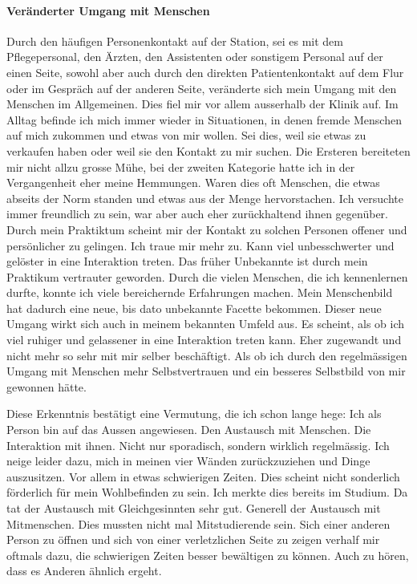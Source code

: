 \paragraph{Veränderter Umgang mit Menschen}
Durch den häufigen Personenkontakt auf der Station, sei es mit dem Pflegepersonal, den Ärzten, den Assistenten oder sonstigem Personal auf der einen Seite, sowohl aber auch durch den direkten Patientenkontakt auf dem Flur oder im Gespräch auf der anderen Seite, veränderte sich mein Umgang mit den Menschen im Allgemeinen. Dies fiel mir vor allem ausserhalb der Klinik auf. Im Alltag befinde ich mich immer wieder in Situationen, in denen fremde Menschen auf mich zukommen und etwas von mir wollen. Sei dies, weil sie etwas zu verkaufen haben oder weil sie den Kontakt zu mir suchen. Die Ersteren bereiteten mir nicht allzu grosse Mühe, bei der zweiten Kategorie hatte ich in der Vergangenheit eher meine Hemmungen. Waren dies oft Menschen, die etwas abseits der Norm standen und etwas aus der Menge hervorstachen. Ich versuchte immer freundlich zu sein, war aber auch eher zurückhaltend ihnen gegenüber. Durch mein Praktiktum scheint mir der Kontakt zu solchen Personen offener und persönlicher zu gelingen. Ich traue mir mehr zu. Kann viel unbesschwerter und gelöster in eine Interaktion treten. Das früher Unbekannte ist durch mein Praktikum vertrauter geworden. Durch die vielen Menschen, die ich kennenlernen durfte, konnte ich viele bereichernde Erfahrungen machen. Mein Menschenbild hat dadurch eine neue, bis dato unbekannte Facette bekommen. Dieser neue Umgang wirkt sich auch in meinem bekannten Umfeld aus. Es scheint, als ob ich viel ruhiger und gelassener in eine Interaktion treten kann. Eher zugewandt und nicht mehr so sehr mit mir selber beschäftigt. Als ob ich durch den regelmässigen Umgang mit Menschen mehr Selbstvertrauen und ein besseres Selbstbild von mir gewonnen hätte. 

Diese Erkenntnis bestätigt eine Vermutung, die ich schon lange hege: Ich als Person bin auf das Aussen angewiesen. Den Austausch mit Menschen. Die Interaktion mit ihnen. Nicht nur sporadisch, sondern wirklich regelmässig. Ich neige leider dazu, mich in meinen vier Wänden zurückzuziehen und Dinge auszusitzen. Vor allem in etwas schwierigen Zeiten. Dies scheint nicht sonderlich förderlich für mein Wohlbefinden zu sein. Ich merkte dies bereits im Studium. Da tat der Austausch mit Gleichgesinnten sehr gut. Generell der Austausch mit Mitmenschen. Dies mussten nicht mal Mitstudierende sein. Sich einer anderen Person zu öffnen und sich von einer verletzlichen Seite zu zeigen verhalf mir oftmals dazu, die schwierigen Zeiten besser bewältigen zu können. Auch zu hören, dass es Anderen ähnlich ergeht. 

